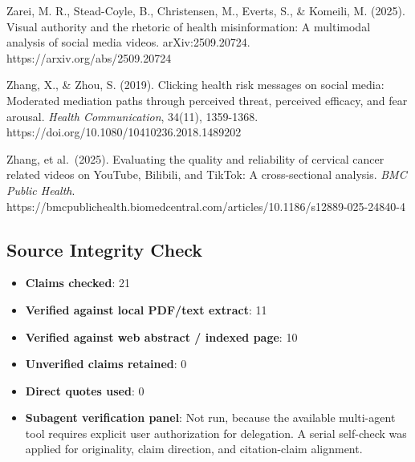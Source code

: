 \documentclass[
  12pt,
]{article}
\providecommand{\tightlist}{%
  \setlength{\itemsep}{0pt}\setlength{\parskip}{0pt}}
\begin{document}
Zarei, M. R., Stead-Coyle, B., Christensen, M., Everts, S., \& Komeili,
M. (2025). Visual authority and the rhetoric of health misinformation: A
multimodal analysis of social media videos. arXiv:2509.20724.
https://arxiv.org/abs/2509.20724

Zhang, X., \& Zhou, S. (2019). Clicking health risk messages on social
media: Moderated mediation paths through perceived threat, perceived
efficacy, and fear arousal. \emph{Health Communication}, 34(11),
1359-1368. https://doi.org/10.1080/10410236.2018.1489202

Zhang, et al.~(2025). Evaluating the quality and reliability of cervical
cancer related videos on YouTube, Bilibili, and TikTok: A
cross-sectional analysis. \emph{BMC Public Health}.
https://bmcpublichealth.biomedcentral.com/articles/10.1186/s12889-025-24840-4

\subsection{Source Integrity Check}\label{source-integrity-check}

\begin{itemize}
\tightlist
\item
  \textbf{Claims checked}: 21
\item
  \textbf{Verified against local PDF/text extract}: 11
\item
  \textbf{Verified against web abstract / indexed page}: 10
\item
  \textbf{Unverified claims retained}: 0
\item
  \textbf{Direct quotes used}: 0
\item
  \textbf{Subagent verification panel}: Not run, because the available
  multi-agent tool requires explicit user authorization for delegation.
  A serial self-check was applied for originality, claim direction, and
  citation-claim alignment.
\end{itemize}
\end{document}

